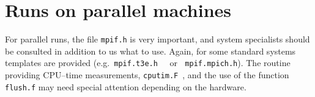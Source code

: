 
\section{Runs on parallel machines} \label{ch:parallel}



For parallel runs, the file {\tt mpif.h} is very important,
and system specialists should be consulted in addition to us
what to use.
Again, for some standard systems templates are provided
(e.g.\ {\tt mpif.t3e.h } $\:$ or $\:$ {\tt mpif.mpich.h}).
The routine providing CPU--time measurements, {\tt cputim.F}~,
and the use of the function {\tt flush.f} may need special
attention depending on the hardware.

